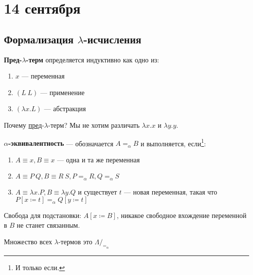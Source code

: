 \chapter{14 сентября}

\section{Формализация \(\lambda\)-исчисления}

\begin{definition}
    \textbf{Пред-\(\lambda\)-терм} определяется индуктивно как одно из:
    \begin{enumerate}
        \item \(x\) --- переменная
        \item \((L\ L)\) --- применение
        \item \((\lambda x.L)\) --- абстракция
    \end{enumerate}
\end{definition}

Почему \underline{пред}-\(\lambda\)-терм? Мы не хотим различать \(\lambda x.x\) и \(\lambda y.y\).

\begin{definition}
    \textbf{\(\alpha\)-эквивалентность} --- обозначается \(A =_\alpha B\) и выполняется, если\footnote{И только если.}:
    \begin{enumerate}
        \item \(A \equiv x, B \equiv x\) --- одна и та же переменная
        \item \(A \equiv P\ Q, B \equiv R\ S, P =_\alpha R, Q =_\alpha S\)
        \item \(A \equiv \lambda x.P, B \equiv \lambda y.Q\) и существует \(t\) --- новая переменная, такая что \(P[x \coloneqq t] =_\alpha Q[y \coloneqq t]\)
    \end{enumerate}
\end{definition}

\begin{definition}
    Свобода для подстановки: \(A[x \coloneqq B]\), никакое свободное вхождение переменной в \(B\) не станет связанным.
\end{definition}

\begin{definition}
    Множество всех \(\lambda\)-термов это \(\Lambda /_{ =_\alpha}\)
\end{definition}

